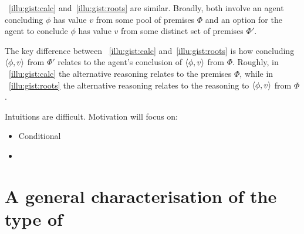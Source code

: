 \begin{note}
  ~\ref{illu:gist:calc} and~\ref{illu:gist:roots} are similar.
  Broadly, both involve an agent concluding \(\phi\) has value \(v\) from some pool of premises \(\Phi\) and an option for the agent to conclude \(\phi\) has value \(v\) from some distinct set of premises \(\Phi'\).

  The key difference between ~\ref{illu:gist:calc} and~\ref{illu:gist:roots} is how concluding \(\langle \phi, v \rangle\) from \(\Phi'\) relates to the agent's conclusion of \(\langle \phi, v \rangle\) from \(\Phi\).
  Roughly, in ~\ref{illu:gist:calc} the alternative reasoning relates to the premises \(\Phi\), while in ~\ref{illu:gist:roots} the alternative reasoning relates to the reasoning to \(\langle \phi, v \rangle\) from \(\Phi\).

  Intuitions are difficult.
  Motivation will focus on:
  \begin{itemize}
  \item
    Conditional
  \item
  \end{itemize}
\end{note}

\section[General characterisation]{A general characterisation of the type of }

